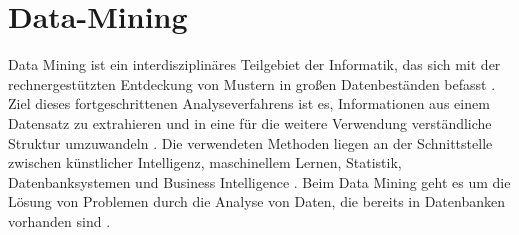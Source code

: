 \section{Data-Mining}
Data Mining ist ein interdisziplinäres Teilgebiet der Informatik, das sich mit der rechnergestützten Entdeckung von Mustern in großen Datenbeständen befasst \cite{jain2013data}. Ziel dieses fortgeschrittenen Analyseverfahrens ist es, Informationen aus einem Datensatz zu extrahieren und in eine für die weitere Verwendung verständliche Struktur umzuwandeln \cite{jain2013data}. Die verwendeten Methoden liegen an der Schnittstelle zwischen künstlicher Intelligenz, maschinellem Lernen, Statistik, Datenbanksystemen und Business Intelligence \cite{jain2013data}. Beim Data Mining geht es um die Lösung von Problemen durch die Analyse von Daten, die bereits in Datenbanken vorhanden sind \cite{jain2013data}.